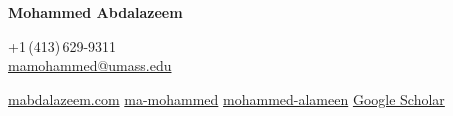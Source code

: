 \documentclass[10pt, a4paper]{article}
\newcommand{\whitelink}[2]{\href{#1}{\color{white}#2}}
\begin{document}

\begin{tcolorbox}[
  enhanced,
  arc=0pt, outer arc=0pt,
  colback=accent, colframe=accent,
  boxrule=0pt, left=0pt, right=0pt, top=0pt, bottom=0pt,
  enlarge left by=-1.8cm,
  enlarge right by=-1.8cm,
  enlarge top by=-1.8cm,
  width=\paperwidth,
]
  \vspace{0.5cm}\hspace{1.8cm}%
  \begin{minipage}[c]{\dimexpr\paperwidth - 3.6cm\relax}
    \noindent
    \begin{minipage}[t]{0.62\linewidth}
      \vspace{0pt}%
      {\color{white}\fontsize{22}{26}\selectfont\bfseries Mohammed Abdalazeem%
       \,}
    \end{minipage}%
    \hfill
    \begin{minipage}[t]{0.35\linewidth}
      \vspace{8pt}%
      \raggedleft
      {\color{white}\small
        \faPhone\enspace+1\,(413)\,629-9311\\[4pt]
        \faEnvelope\enspace\whitelink{mailto:mamohammed@umass.edu}{mamohammed@umass.edu}%
      }
    \end{minipage}
    \vspace{3pt}
    {\color{white}\small
      \faGlobe\enspace\whitelink{https://mabdalazeem.com}{mabdalazeem.com}\hspace{1.4em}%
      \faGithub\enspace\whitelink{https://github.com/ma-mohammed}{ma-mohammed}\hspace{1.4em}%
      \faLinkedin\enspace\whitelink{https://www.linkedin.com/in/mohammed-alameen/}{mohammed-alameen}\hspace{1.4em}%
      \faGraduationCap\enspace\whitelink{https://scholar.google.com/citations?user=gHxllswAAAAJ\&hl=en}{Google Scholar}%
    }
  \end{minipage}\hspace{1.8cm}%
  \vspace{0.3cm}
\end{tcolorbox}
\end{document}
